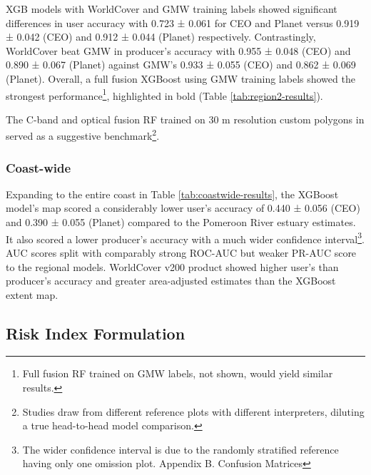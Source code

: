 \documentclass[final-report]{report-template}
\begin{document}

XGB models with WorldCover and GMW training labels showed significant differences in user accuracy with 0.723 ± 0.061 for CEO and Planet versus 0.919 ± 0.042 (CEO) and 0.912 ± 0.044 (Planet) respectively. Contrastingly, WorldCover beat GMW in producer's accuracy with 0.955 ± 0.048 (CEO) and 0.890 ± 0.067 (Planet) against GMW's 0.933 ± 0.055 (CEO) and 0.862 ± 0.069 (Planet). Overall, a full fusion XGBoost using GMW training labels showed the strongest performance\footnote{Full fusion RF trained on GMW labels, not shown, would yield similar results.}, highlighted in bold (Table \ref{tab:region2-results}).

The C-band and optical fusion RF trained on 30 m resolution custom polygons in \textcite{Chan2024} served as a suggestive benchmark\footnote{Studies draw from different reference plots with different interpreters, diluting a true head-to-head model comparison.}. 

\subsubsection{Coast-wide}
Expanding to the entire coast in Table \ref{tab:coastwide-results}, the XGBoost model's map scored a considerably lower user's accuracy of 0.440 ± 0.056 (CEO) and 0.390 ± 0.055 (Planet) compared to the Pomeroon River estuary estimates. It also scored a lower producer's accuracy with a much wider confidence interval\footnote{The wider confidence interval is due to the randomly stratified reference having only one omission plot. Appendix B. Confusion Matrices}. AUC scores split with comparably strong ROC-AUC but weaker PR-AUC score to the regional models. WorldCover v200 product showed higher user's than producer's accuracy and greater area-adjusted estimates than the XGBoost extent map. 

\subsection{Risk Index Formulation}
\end{document}
